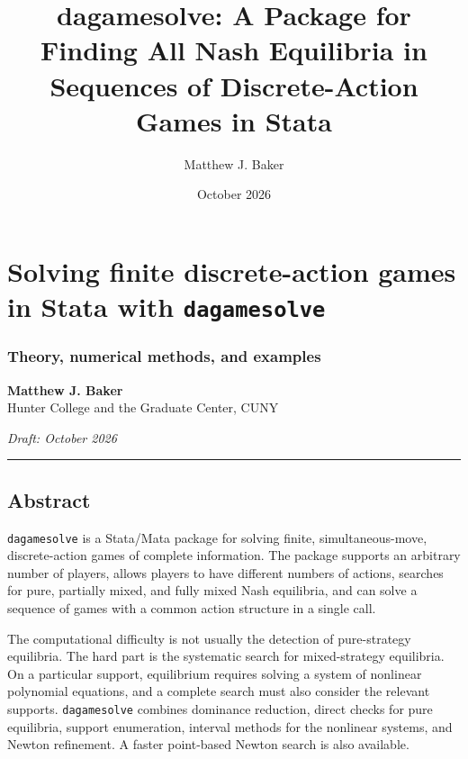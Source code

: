 \documentclass[11pt]{article}
\title{dagamesolve: A Package for Finding All Nash Equilibria in Sequences of Discrete-Action Games in Stata}
\date{October 2026}
\author{Matthew J. Baker}
\begin{document}
    
    \maketitle
    
    

    
    \hypertarget{solving-finite-discrete-action-games-in-stata-with-dagamesolve}{%
\section{\texorpdfstring{Solving finite discrete-action games in Stata
with
\texttt{dagamesolve}}{Solving finite discrete-action games in Stata with dagamesolve}}\label{solving-finite-discrete-action-games-in-stata-with-dagamesolve}}

\hypertarget{theory-numerical-methods-and-examples}{%
\subsubsection{Theory, numerical methods, and
examples}\label{theory-numerical-methods-and-examples}}

\textbf{Matthew J. Baker}\\
Hunter College and the Graduate Center, CUNY

\emph{Draft: October 2026}

\begin{center}\rule{0.5\linewidth}{0.5pt}\end{center}

\hypertarget{abstract}{%
\subsection{Abstract}\label{abstract}}

\texttt{dagamesolve} is a Stata/Mata package for solving finite,
simultaneous-move, discrete-action games of complete information. The
package supports an arbitrary number of players, allows players to have
different numbers of actions, searches for pure, partially mixed, and
fully mixed Nash equilibria, and can solve a sequence of games with a
common action structure in a single call.

The computational difficulty is not usually the detection of
pure-strategy equilibria. The hard part is the systematic search for
mixed-strategy equilibria. On a particular support, equilibrium requires
solving a system of nonlinear polynomial equations, and a complete
search must also consider the relevant supports. \texttt{dagamesolve}
combines dominance reduction, direct checks for pure equilibria, support
enumeration, interval methods for the nonlinear systems, and Newton
refinement. A faster point-based Newton search is also available.
\end{document}
